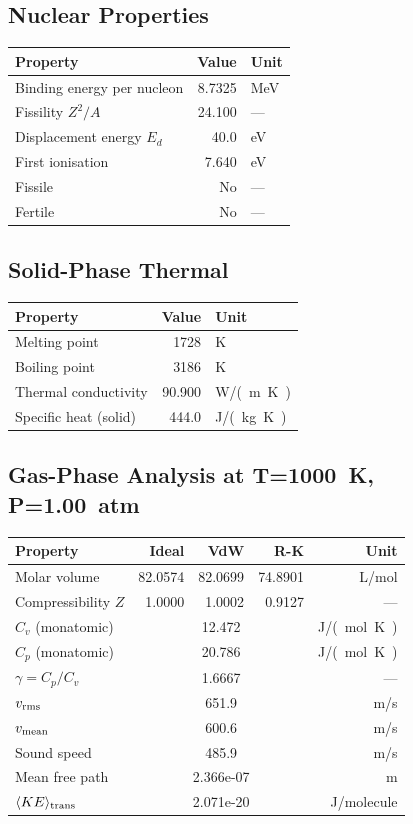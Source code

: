 \documentclass[11pt,a4paper]{article}
\begin{document}
\subsection{Nuclear Properties}
\begin{tabular}{lrl}
  \toprule
  Property & Value & Unit \\
  \midrule
  Binding energy per nucleon & 8.7325 & \si{MeV} \\
  Fissility $Z^2/A$ & 24.100 & --- \\
  Displacement energy $E_d$ & 40.0 & \si{eV} \\
  First ionisation & 7.640 & \si{eV} \\
  Fissile & No & --- \\
  Fertile & No & --- \\
  \bottomrule
\end{tabular}

\subsection{Solid-Phase Thermal}
\begin{tabular}{lrl}
  \toprule
  Property & Value & Unit \\
  \midrule
  Melting point & 1728 & \si{K} \\
  Boiling point & 3186 & \si{K} \\
  Thermal conductivity & 90.900 & \si{W/(m.K)} \\
  Specific heat (solid) & 444.0 & \si{J/(kg.K)} \\
  \bottomrule
\end{tabular}

\subsection{Gas-Phase Analysis at T=\SI{1000}{K}, P=\SI{1.00}{atm}}
\begin{tabular}{lrrrr}
  \toprule
  Property & Ideal & VdW & R-K & Unit \\
  \midrule
  Molar volume & 82.0574 & 82.0699 & 74.8901 & \si{L/mol} \\
  Compressibility $Z$ & 1.0000 & 1.0002 & 0.9127 & --- \\
  \midrule
  $C_v$ (monatomic) & \multicolumn{3}{c}{12.472} & \si{J/(mol.K)} \\
  $C_p$ (monatomic) & \multicolumn{3}{c}{20.786} & \si{J/(mol.K)} \\
  $\gamma = C_p/C_v$ & \multicolumn{3}{c}{1.6667} & --- \\
  $v_{\rm rms}$ & \multicolumn{3}{c}{651.9} & \si{m/s} \\
  $v_{\rm mean}$ & \multicolumn{3}{c}{600.6} & \si{m/s} \\
  Sound speed & \multicolumn{3}{c}{485.9} & \si{m/s} \\
  Mean free path & \multicolumn{3}{c}{2.366e-07} & \si{m} \\
  $\langle KE \rangle_{\rm trans}$ & \multicolumn{3}{c}{2.071e-20} & \si{J/molecule} \\
  \bottomrule
\end{tabular}
\end{document}

